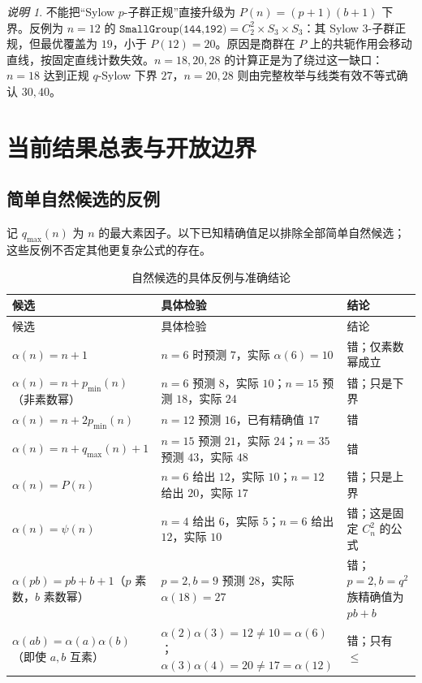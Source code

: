 \documentclass[11pt,a4paper]{article}
\numberwithin{equation}{section}
\theoremstyle{plain}
\theoremstyle{definition}
\theoremstyle{remark}
\newtheorem{remark}[theorem]{说明}
\begin{document}
\begin{remark}
不能把“Sylow $p$-子群正规”直接升级为 $P(n)=(p+1)(b+1)$ 下界。反例为 $n=12$ 的
$\texttt{SmallGroup(144,192)}=C_2^2\times S_3\times S_3$：其 Sylow $3$-子群正规，但最优覆盖为 $19$，小于 $P(12)=20$。原因是商群在 $P$ 上的共轭作用会移动直线，按固定直线计数失效。$n=18,20,28$ 的计算正是为了绕过这一缺口：$n=18$ 达到正规 $q$-Sylow 下界 $27$，$n=20,28$ 则由完整枚举与线类有效不等式确认 $30,40$。
\end{remark}

\section{当前结果总表与开放边界}
\subsection{简单自然候选的反例}
记 $q_{\max}(n)$ 为 $n$ 的最大素因子。以下已知精确值足以排除全部简单自然候选；这些反例不否定其他更复杂公式的存在。
\begin{longtable}{L{0.28\textwidth}L{0.46\textwidth}L{0.16\textwidth}}
\caption{自然候选的具体反例与准确结论}\label{tab:counterexamples}\\
\toprule
候选 & 具体检验 & 结论\\
\midrule
\endfirsthead
\toprule
候选 & 具体检验 & 结论\\
\midrule
\endhead
$\alpha(n)=n+1$ & $n=6$ 时预测 $7$，实际 $\alpha(6)=10$ & 错；仅素数幂成立\\
$\alpha(n)=n+p_{\min}(n)$（非素数幂） & $n=6$ 预测 $8$，实际 $10$；$n=15$ 预测 $18$，实际 $24$ & 错；只是下界\\
$\alpha(n)=n+2p_{\min}(n)$ & $n=12$ 预测 $16$，已有精确值 $17$ & 错\\
$\alpha(n)=n+q_{\max}(n)+1$ & $n=15$ 预测 $21$，实际 $24$；$n=35$ 预测 $43$，实际 $48$ & 错\\
$\alpha(n)=P(n)$ & $n=6$ 给出 $12$，实际 $10$；$n=12$ 给出 $20$，实际 $17$ & 错；只是上界\\
$\alpha(n)=\psi(n)$ & $n=4$ 给出 $6$，实际 $5$；$n=6$ 给出 $12$，实际 $10$ & 错；这是固定 $C_n^2$ 的公式\\
$\alpha(pb)=pb+b+1$\newline （$p$ 素数，$b$ 素数幂） & $p=2,b=9$ 预测 $28$，实际 $\alpha(18)=27$ & 错；$p=2,b=q^2$ 族精确值为 $pb+b$\\
$\alpha(ab)=\alpha(a)\alpha(b)$\newline （即使 $a,b$ 互素） & $\alpha(2)\alpha(3)=12\ne10=\alpha(6)$；$\alpha(3)\alpha(4)=20\ne17=\alpha(12)$ & 错；只有 $\le$\\
\bottomrule
\end{longtable}
\end{document}
